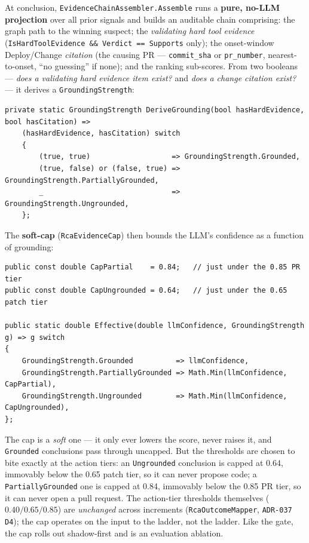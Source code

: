 \documentclass[11pt]{article}
\begin{document}
At conclusion, \texttt{EvidenceChainAssembler.Assemble} runs a \textbf{pure,
no-LLM projection} over all prior signals and builds an auditable chain
comprising: the graph path to the winning suspect; the \emph{validating hard
tool evidence} (\texttt{IsHardToolEvidence \&\& Verdict == Supports} only);
the onset-window Deploy/Change \emph{citation} (the causing PR ---
\texttt{commit\_sha} or \texttt{pr\_number}, nearest-to-onset, ``no guessing''
if none); and the ranking sub-scores. From two booleans --- \emph{does a
validating hard evidence item exist?} and \emph{does a change citation exist?}
--- it derives a \texttt{GroundingStrength}:

\begin{verbatim}
private static GroundingStrength DeriveGrounding(bool hasHardEvidence, bool hasCitation) =>
    (hasHardEvidence, hasCitation) switch
    {
        (true, true)                   => GroundingStrength.Grounded,
        (true, false) or (false, true) => GroundingStrength.PartiallyGrounded,
        _                              => GroundingStrength.Ungrounded,
    };
\end{verbatim}

The \textbf{soft-cap} (\texttt{RcaEvidenceCap}) then bounds the LLM's
confidence as a function of grounding:

\begin{verbatim}
public const double CapPartial    = 0.84;   // just under the 0.85 PR tier
public const double CapUngrounded = 0.64;   // just under the 0.65 patch tier

public static double Effective(double llmConfidence, GroundingStrength g) => g switch
{
    GroundingStrength.Grounded          => llmConfidence,
    GroundingStrength.PartiallyGrounded => Math.Min(llmConfidence, CapPartial),
    GroundingStrength.Ungrounded        => Math.Min(llmConfidence, CapUngrounded),
};
\end{verbatim}

The cap is a \emph{soft} one --- it only ever lowers the score, never raises
it, and \texttt{Grounded} conclusions pass through uncapped. But the
thresholds are chosen to bite exactly at the action tiers: an
\texttt{Ungrounded} conclusion is capped at 0.64, immovably below the 0.65
patch tier, so it can never propose code; a \texttt{PartiallyGrounded} one is
capped at 0.84, immovably below the 0.85 PR tier, so it can never open a pull
request. The action-tier thresholds themselves ($0.40 / 0.65 / 0.85$) are
\emph{unchanged} across increments (\texttt{RcaOutcomeMapper},
\texttt{ADR-037 D4}); the cap operates on the input to the ladder, not the
ladder. Like the gate, the cap rolls out shadow-first and is an evaluation
ablation.
\end{document}
